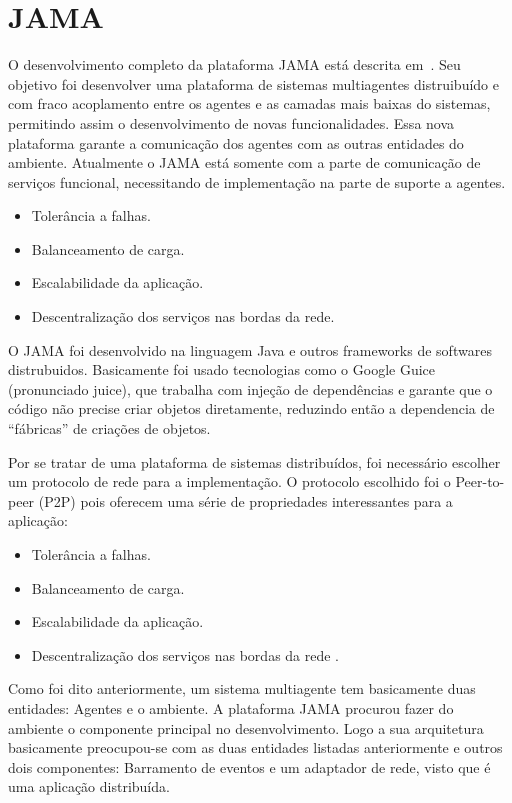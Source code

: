 \section{JAMA}

O desenvolvimento completo da plataforma JAMA está descrita em~\cite{parise11}. Seu objetivo foi desenvolver uma plataforma de sistemas multiagentes distruibuído e com fraco acoplamento entre os agentes e as camadas mais baixas do sistemas, permitindo assim o desenvolvimento de novas funcionalidades. Essa nova plataforma garante a comunicação dos agentes com as outras entidades do ambiente. Atualmente o JAMA está somente com a parte de comunicação de serviços funcional, necessitando de implementação na parte de suporte a agentes.
\begin{itemize}
	\item Tolerância a falhas.
	\item Balanceamento de carga.
	\item Escalabilidade da aplicação.
	\item Descentralização dos serviços nas bordas da rede.
\end{itemize}


O JAMA foi desenvolvido na linguagem Java e outros frameworks de softwares distrubuidos. Basicamente foi usado tecnologias como o Google Guice (pronunciado juice), que trabalha com injeção de dependências e garante que o código não precise criar objetos diretamente, reduzindo então a dependencia de ``fábricas'' de criações de objetos.

Por se tratar de uma plataforma de sistemas distribuídos, foi necessário escolher um protocolo de rede para a implementação. O protocolo escolhido foi o Peer-to-peer (P2P) pois oferecem uma série de propriedades interessantes para a aplicação:
\begin{itemize}
	\item Tolerância a falhas.
	\item Balanceamento de carga.
	\item Escalabilidade da aplicação.
	\item Descentralização dos serviços nas bordas da rede	.
\end{itemize}

Como foi dito anteriormente, um sistema multiagente tem basicamente duas entidades: Agentes e o ambiente. A plataforma JAMA procurou fazer do ambiente o componente principal no desenvolvimento. Logo a sua arquitetura basicamente preocupou-se com as duas entidades listadas anteriormente e outros dois componentes: Barramento de eventos e um adaptador de rede, visto que é uma aplicação distribuída.

